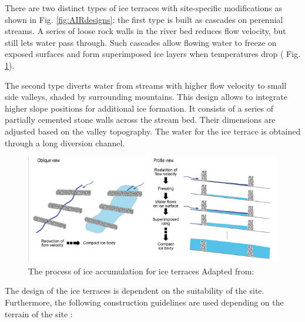 There are two distinct types of ice terraces with site-specific modifications as shown in Fig.
\ref{fig:AIRdesigns}: the first type is built as cascades on perennial streams. A series of loose rock walls in
the river bed reduces flow velocity, but still lets water pass through. Such cascades allow flowing water to
freeze on exposed surfaces and form superimposed ice layers when temperatures drop ( Fig.
\ref{fig:ITscience}).

The second type diverts water from streams with higher flow velocity to small side valleys, shaded by
surrounding mountains. This design allows to integrate higher slope positions for additional ice formation. It
consists of a series of partially cemented stone walls across the stream bed. Their dimensions are adjusted
based on the valley topography. The water for the ice terrace is obtained through a long diversion channel.

\begin{figure}[htb]
\centering
\includegraphics[width=\textwidth]{figs/IT_science.png}

\caption{ The process of ice accumulation for ice terraces Adapted from:
\cite{nusserSociohydrologyArtificialGlaciers2019}}

\label{fig:ITscience}
\end{figure}

The design of the ice terraces is dependent on the suitability of the
site. Furthermore, the following construction guidelines are used depending on the terrain of the site
\cite{norphelSnowWaterHarvesting2015}:

